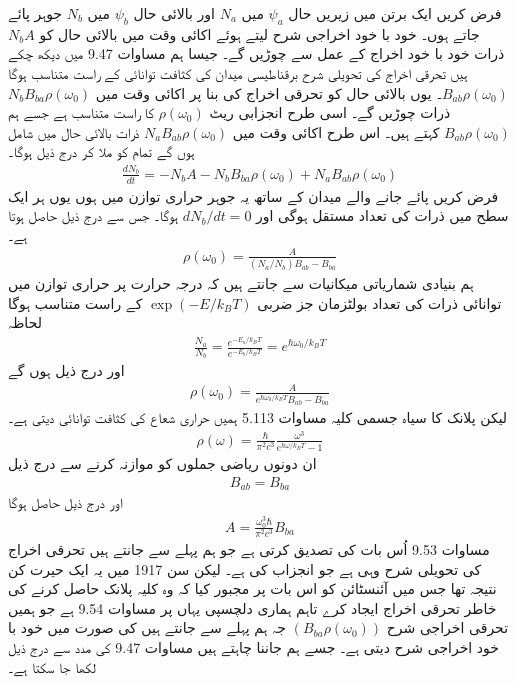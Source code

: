 فرض کریں ایک برتن میں زیریں حال \(\psi_a\) میں \(N_a\) اور بالائی حال \(\psi_b\) میں \(N_b\) جوہر پائے جاتے ہوں۔ خود با خود اخراجی شرح  لیتے ہوئے اکائی وقت میں بالائی حال کو \(N_bA\) ذرات خود با خود اخراج کے عمل سے چوڑیں گے۔ جیسا ہم مساوات \num{9.47} میں دیکھ چکے ہیں تحرقی اخراج کی تحویلی شرح برقناطیسی میدان کی کثافت توانائی کے راست متناسب ہوگا \(B_{ab}\rho(\omega_0)\)۔ یوں بالائی حال کو تحرقی اخراج کی بنا پر اکائی وقت میں \(N_bB_{ba}\rho(\omega_0)\) ذرات چوڑیں گے۔ اسی طرح انجزابی ریٹ \(\rho(\omega_0)\) کا راست متناسب ہے جسے ہم \(B_{ab}\rho(\omega_0)\) کہتے ہیں۔ اس طرح اکائی وقت میں \(N_aB_{ab}\rho(\omega_0)\) ذرات بالائی حال میں شامل ہوں گے تمام کو ملا کر درج ذیل ہوگا۔
\begin{align}
	\frac{dN_b}{dt} = -N_bA-N_bB_{ba}\rho(\omega_0)+N_aB_{ab}\rho(\omega_0)
\end{align}
فرض کریں پائے جانے والے میدان کے ساتھ یہ جوہر حراری توازن میں ہوں یوں ہر ایک سطح میں ذرات کی تعداد مستقل ہوگی اور \(dN_b/dt = 0\) ہوگا۔ جس سے درج ذیل حاصل ہوتا ہے۔
\begin{align}
	\rho(\omega_0) = \frac{A}{(N_a/N_b)B_{ab}-B_{ba}}
\end{align}
ہم بنیادی شماریاتی میکانیات سے جانتے ہیں کہ درجہ حرارت  پر حراری توازن میں توانائی  ذرات کی تعداد بولٹزمان جز ضربی \(\exp(-E/k_BT)\) کے راست متناسب ہوگا لحاظہ
\begin{align}
	\frac{N_a}{N_b} = \frac{e^{-E_a/k_{B}T}}{e^{-E_b/k_BT}} = e^{\hbar\omega_0/k_BT}
\end{align}
اور درج ذیل ہوں گے
\begin{align}
	\rho(\omega_0) = \frac{A}{e^{\hbar\omega_0/k_BT}B_{ab}-B_{ba}}
\end{align}
لیکن پلانک کا سیاہ جسمی کلیہ مساوات \num{5.113} ہمیں حراری شعاع کی کثافت توانائی دیتی ہے۔
\begin{align}
	\rho(\omega) = \frac{\hbar}{\pi^2c^3}\frac{\omega^3}{e^{\hbar\omega/k_BT}-1}
\end{align}
ان دونوں ریاضی جملوں کو موازنہ کرنے سے درج ذیل 
\begin{align}
	B_{ab} = B_{ba}
\end{align}
اور درج ذیل حاصل ہوگا
\begin{align}
	A = \frac{\omega^3_0\hbar}{\pi^2c^3}B_{ba}
\end{align}
مساوات \num{9.53} اُس بات کی تصدیق کرتی ہے جو ہم پہلے سے جانتے ہیں تحرقی اخراج کی تحویلی شرح وہی ہے جو انجزاب کی ہے۔ لیکن سن \num{1917} میں یہ ایک حیرت کن نتیجہ تھا جس میں آئنسٹائن کو اس بات پر مجبور کیا کہ وہ کلیہ پلانک حاصل کرنے کی خاطر تحرقی اخراج ایجاد کرے تاہم ہماری دلچسپی یہاں پر مساوات \num{9.54} ہے جو ہمیں تحرقی اخراجی شرح \((B_{ba}\rho(\omega_0))\) جہ ہم پہلے سے جانتے ہیں کی صورت میں خود با خود اخراجی شرح  دیتی ہے۔ جسے ہم جاننا چاہتے ہیں مساوات \num{9.47} کی مدد سے درج ذیل لکھا جا سکتا ہے۔

